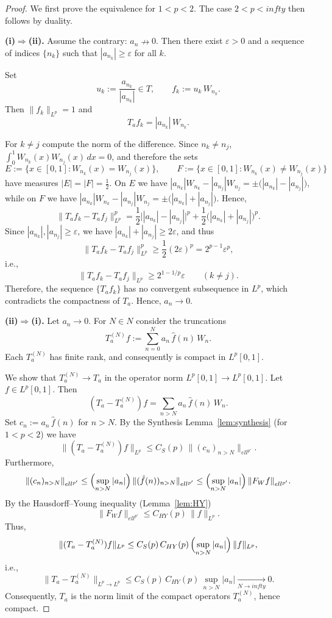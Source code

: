\documentclass[10pt,a4paper]{amsart}
\newcommand{\F}{\mathcal{F}_W}
\newcommand{\Lp}{L^p[0,1]}
\def\ell{ell}%
\def\infty{infty}%
\def\mathbb#1{#1}%
\def\mathcal#1{#1}%
\begin{document}
\begin{proof}
We first prove the equivalence for $1<p<2$.
The case $2<p<\infty$ then follows by duality.

\textbf{(i)$\Rightarrow$(ii).}
Assume the contrary: $a_n\nrightarrow 0$.
Then there exist $\varepsilon>0$ and a sequence of indices $\{n_k\}$ such that
$|a_{n_k}|\ge\varepsilon$ for all $k$.

Set
\[
u_k:=\frac{a_{n_k}}{|a_{n_k}|}\in\mathbb T,\qquad
f_k:=u_k\,W_{n_k}.
\]
Then $\|f_k\|_{L^p}=1$ and
\[
T_af_k = |a_{n_k}|\,W_{n_k}.
\]

For $k\neq j$ compute the norm of the difference. Since $n_k\neq n_j$,
$\int_0^1 W_{n_k}(x)W_{n_j}(x)\,dx=0$, and therefore the sets
\[
E:=\{x\in[0,1]: W_{n_k}(x)=W_{n_j}(x)\},\qquad
F:=\{x\in[0,1]: W_{n_k}(x)\neq W_{n_j}(x)\}
\]
have measures $|E|=|F|=\frac12$.
On $E$ we have
$|a_{n_k}|W_{n_k}-|a_{n_j}|W_{n_j}=\pm\bigl(|a_{n_k}|-|a_{n_j}|\bigr)$,
while on $F$ we have
$|a_{n_k}|W_{n_k}-|a_{n_j}|W_{n_j}=\pm\bigl(|a_{n_k}|+|a_{n_j}|\bigr)$.
Hence,
\[
\|T_af_k-T_af_j\|_{L^p}^p
= \frac12\bigl||a_{n_k}|-|a_{n_j}|\bigr|^p
 + \frac12\bigl(|a_{n_k}|+|a_{n_j}|\bigr)^p.
\]
Since $|a_{n_k}|,|a_{n_j}|\ge\varepsilon$, we have $|a_{n_k}|+|a_{n_j}|\ge 2\varepsilon$, and thus
\[
\|T_af_k-T_af_j\|_{L^p}^p \ge \frac12(2\varepsilon)^p
= 2^{p-1}\varepsilon^p,
\]
i.e.,
\[
\|T_af_k-T_af_j\|_{L^p}\ge 2^{1-1/p}\varepsilon\qquad(k\neq j).
\]
Therefore, the sequence $\{T_af_k\}$ has no convergent subsequence in $L^p$,
which contradicts the compactness of $T_a$. Hence, $a_n\to0$.

\medskip
\textbf{(ii)$\Rightarrow$(i).}
Let $a_n\to0$.
For $N\in\mathbb{N}$ consider the truncations
\[
T_a^{(N)}f := \sum_{n=0}^N a_n\,\hat{f}(n)\,W_n.
\]
Each $T_a^{(N)}$ has finite rank, and consequently is compact in $\Lp$.

We show that $T_a^{(N)}\to T_a$ in the operator norm $\Lp\to\Lp$.
Let $f\in\Lp$. Then
\[
(T_a-T_a^{(N)})f=\sum_{n>N} a_n\,\hat{f}(n)\,W_n.
\]
Set $c_n:=a_n\,\hat{f}(n)$ for $n>N$.
By the Synthesis Lemma~\ref{lem:synthesis} (for $1<p<2$) we have
\[
\|(T_a-T_a^{(N)})f\|_{L^p}
\le C_S(p)\,\|(c_n)_{n>N}\|_{\ell^{p'}}.
\]
Furthermore,
\[
\|(c_n)_{n>N}\|_{\ell^{p'}}
\le \Bigl(\sup_{n>N}|a_n|\Bigr)\,\|(\hat{f}(n))_{n>N}\|_{\ell^{p'}}
\le \Bigl(\sup_{n>N}|a_n|\Bigr)\,\|\F f\|_{\ell^{p'}}.
\]
By the Hausdorff–Young inequality (Lemma~\ref{lem:HY})
\[
\|\F f\|_{\ell^{p'}}\le C_{HY}(p)\,\|f\|_{L^p}.
\]
Thus,
\[
\|(T_a-T_a^{(N)})f\|_{L^p}
\le C_S(p)\,C_{HY}(p)\,\Bigl(\sup_{n>N}|a_n|\Bigr)\,\|f\|_{L^p},
\]
i.e.,
\[
\|T_a-T_a^{(N)}\|_{L^p\to L^p}
\le C_S(p)\,C_{HY}(p)\,\sup_{n>N}|a_n|\xrightarrow[N\to\infty]{}0.
\]
Consequently, $T_a$ is the norm limit of the compact operators $T_a^{(N)}$,
hence compact.


\end{proof}
\end{document}
